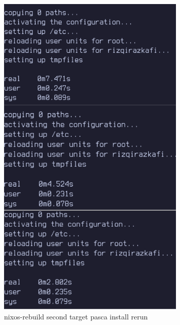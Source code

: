 \documentclass[10pt,twoside]{report}
\begin{document}
\begin{adjustwidth}{20pt}{}
\begin{adjustwidth}{20pt}{}
		\begin{figure}[H]
			\begin{center}
				\includegraphics[width=0.8\textwidth]{images/nix-target/nix-rerun-26-com.png}
			\end{center}
			\caption{nixos-rebuild second target pasca install rerun}
		\end{figure}


\end{adjustwidth}
\end{adjustwidth}
\end{document}
